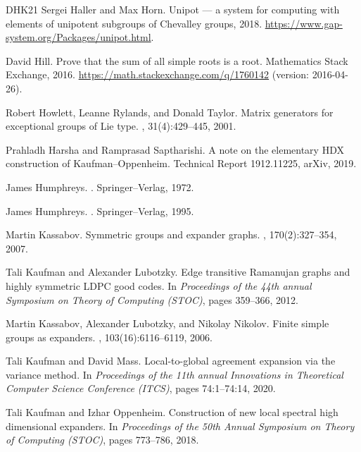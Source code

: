 \documentclass[10pt,a4paper]{article}
\theoremstyle{definition}
\begin{document}
\begin{thebibliography}{DHK{\etalchar{+}}21}
Sergei Haller and Max Horn.
\newblock Unipot --- a system for computing with elements of unipotent
  subgroups of {C}hevalley groups, 2018.
\newblock \url{https://www.gap-system.org/Packages/unipot.html}.

David Hill.
\newblock Prove that the sum of all simple roots is a root.
\newblock Mathematics Stack Exchange, 2016.
\newblock \url{https://math.stackexchange.com/q/1760142} (version: 2016-04-26).

Robert Howlett, Leanne Rylands, and Donald Taylor.
\newblock Matrix generators for exceptional groups of {L}ie type.
, 31(4):429--445, 2001.

Prahladh Harsha and Ramprasad Saptharishi.
\newblock A note on the elementary {HDX} construction of
  {K}aufman--{O}ppenheim.
\newblock Technical Report 1912.11225, arXiv, 2019.

James Humphreys.
.
\newblock Springer--Verlag, 1972.

James Humphreys.
.
\newblock Springer--Verlag, 1995.

Martin Kassabov.
\newblock Symmetric groups and expander graphs.
, 170(2):327--354, 2007.

Tali Kaufman and Alexander Lubotzky.
\newblock Edge transitive {R}amanujan graphs and highly symmetric {LDPC} good
  codes.
\newblock In {\em Proceedings of the 44th annual Symposium on Theory of
  Computing (STOC)}, pages 359--366, 2012.

Martin Kassabov, Alexander Lubotzky, and Nikolay Nikolov.
\newblock Finite simple groups as expanders.
, 103(16):6116--6119, 2006.

Tali Kaufman and David Mass.
\newblock Local-to-global agreement expansion via the variance method.
\newblock In {\em Proceedings of the 11th annual Innovations in Theoretical
  Computer Science Conference (ITCS)}, pages 74:1--74:14, 2020.

Tali Kaufman and Izhar Oppenheim.
\newblock Construction of new local spectral high dimensional expanders.
\newblock In {\em Proceedings of the 50th Annual Symposium on Theory of
  Computing (STOC)}, pages 773--786, 2018.


\end{thebibliography}
\end{document}
